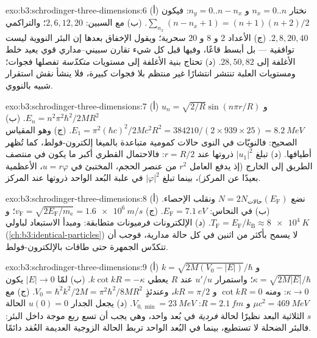 \begin{solution}{exo:b3:schrodinger-three-dimensions:6}
(أ) نختار $n_x = 0..n$ و $n_y = 0..n - n_x$: فيكون $\sum_{n_x}(n - n_x
+ 1) = (n+1)(n+2)/2$. (ب) مع السبين: $2, 6, 12, 20$؛ والتراكمي $2,
8, 20, 40$. (ج) الأعداد $2$ و $8$ و $20$ سحرية؛ ويقول الإخفاق بعدها
إن البئر النووية ليست توافقية --- بل أبسط قاعًا، وفيها قبل كل شيء
تقارن سبيني--مداري قوي يعيد خلط
الأغلفة إلى $28, 50, 82$. (د) تحتاج بنية الأغلفة إلى مستويات
\emph{متكدّسة} تفصلها فجوات؛ ومستويات العلبة تنتشر انتشارًا غير منتظم
بلا فجوات كبيرة، فلا ينشأ نقش استقرار شبيه بالنووي.
\end{solution}

\begin{solution}{exo:b3:schrodinger-three-dimensions:7}
(أ) $u_n = \sqrt{2/R}\sin(n\pi r/R)$ و $E_n = n^2\pi^2\hbar^2/2MR^2$.
(ب) $E_1 = \pi^2(\hbar c)^2/2Mc^2R^2 = 384210/(2 \times 939 \times
25) = \qty{8.2}{MeV}$. (ج) وهو المقياس الصحيح: فالنويّات في النوى
حالات كمومية متباعدة بالميغا إلكترون-فولط، كما تُظهر أطيافها. (د) تبلغ $|u_1|^2$
ذروتها عند $r = R/2$: فالاحتمال القطري أكبر ما يكون في منتصف الطريق
إلى الخارج (إذ يدفع العامل $r^2$ من عنصر الحجم، المختبئ في $u = r\varphi$،
الأعظمية بعيدًا عن المركز)، بينما تبلغ $|\varphi|^2$ في علبة البُعد الواحد
ذروتها عند المركز.
\end{solution}

\begin{solution}{exo:b3:schrodinger-three-dimensions:8}
(أ) نضع $N = 2N_{\text{حالات}}(E_{\text{F}})$ ونقلب الإحصاء.
(ب) في النحاس: $E_{\text{F}} = \qty{7.1}{eV}$. (ج) $v_{\text{F}} =
\sqrt{2E_{\text{F}}/m_{\text{e}}} = \qty{1.6e6}{m/s}$؛
و $T_{\text{F}} = E_{\text{F}}/k_{\text{B}} \approx \qty{8e4}{K}$. (د)
الإلكترونات فرميونات متطابقة: ومبدأ الاستبعاد لباولي
(\cref{ch:b3:identical-particles}) لا يسمح بأكثر من اثنين في كل
حالة مدارية، فوجب أن تتكدّس الجمهرة حتى طاقات بالإلكترون-فولط.
\end{solution}

\begin{solution}{exo:b3:schrodinger-three-dimensions:9}
(أ) $k = \sqrt{2M(V_0 - |E|)}/\hbar$ و $\kappa = \sqrt{2M|E|}/\hbar$؛
واستمرار $u'/u$ عند $R$ يعطي $k\cot kR = -\kappa$. (ب) لمّا $|E|
\to 0$ يكون $\kappa \to 0$: ومنه $\cot kR = 0$ و $kR = \pi/2$، وعندئذٍ $V_0 =
\hbar^2k^2/2M = \pi^2\hbar^2/8MR^2$. (ج) مع $\mu c^2 =
\qty{469}{MeV}$ و $R = \qty{2.1}{fm}$: $V_{0,\min} = \qty{23}{MeV}$.
(د) يجعل الجدار $u(0) = 0$ الحالة $s$ الثلاثية البعد نظيرًا لحالة
\emph{فردية} في بُعد واحد، وهي يجب أن تسع ربع موجة داخل البئر:
فالبئر الضحلة لا تستطيع، بينما في البُعد الواحد تربط الحالة الزوجية
العديمة العُقد دائمًا.
\end{solution}

